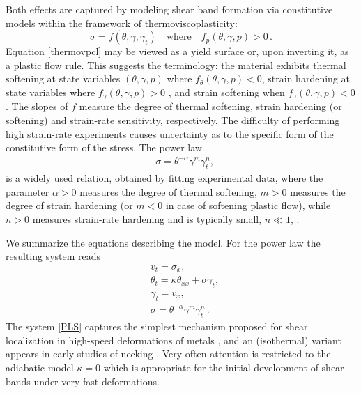 \documentclass[a4paper,11pt]{article}
\newcommand{\tht}{\theta}
\newcommand{\ga}{\alpha}
\theoremstyle{remark}
\begin{document}
Both effects are captured by modeling shear band formation via constitutive models
within the framework  of thermoviscoplasticity: 
\begin{equation}
\label{thermovpcl}
\sigma = f(\theta, \gamma, \gamma_t) \quad \mbox{where} \quad f_p (\theta, \gamma, p)  > 0 \, .
\end{equation}
Equation \eqref{thermovpcl} may be viewed as a yield surface or,  upon inverting it, as a plastic flow rule. This suggests the terminology: 
the material exhibits thermal softening at state variables $(\theta, \gamma, p)$ 
where $f_\theta(\theta, \gamma, p) < 0$, strain hardening at state variables where $f_\gamma(\theta, \gamma, p) > 0$ , and strain softening when $f_\gamma(\theta, \gamma, p) < 0$. 
The slopes of $f$ measure the degree of thermal softening, strain hardening (or softening) 
and strain-rate sensitivity, respectively. 
The difficulty of performing high strain-rate experiments causes uncertainty as to the specific form of the constitutive form of the stress.  The power law
\begin{align}
&  \sigma =  \theta^{-\alpha} \gamma^{m} \gamma_{t}^{n}, 
 \label{PL0}
\end{align}
is a widely used relation, obtained by fitting experimental data, where the parameter $\alpha>0$ 
measures the degree of thermal softening, $m>0$ measures the degree of strain hardening (or $m<0$ in case of softening plastic flow), while $n>0$ measures strain-rate hardening and is typically small, $n \ll 1$, \cite{Clifton90}. 



 We summarize the equations describing the model. For the power law
the resulting system reads
\begin{equation}
  \label{PLS}
  \begin{aligned}
    & v_{t} =  \sigma_{x},\\
    & \theta_{t} = \kappa \theta_{ x x}  +  \sigma \gamma_{t}, \\
    & \gamma_{t} = v_{x},  \\
    & \sigma  = \theta^{-\alpha}\gamma^{m}\gamma_{t}^n \, .
  \end{aligned}
\end{equation}
The system \eqref{PLS} captures the simplest mechanism proposed for shear localization in
high-speed deformations of metals \cite{ZH44, Clifton90}, and an (isothermal) variant appears in early studies of necking \cite{HN77}. 
Very often attention is restricted to the adiabatic model $\kappa = 0$ which is appropriate for the initial
development of shear bands under very fast deformations. 
\end{document}

